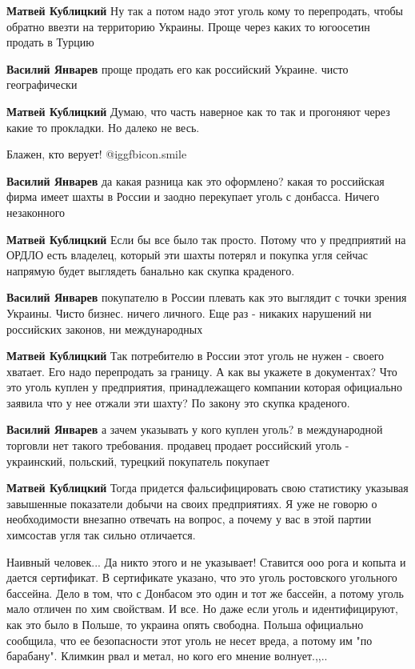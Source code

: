 \begin{itemize}
\begin{itemize}
\textbf{Матвей Кублицкий} Ну так а потом надо этот уголь кому то перепродать, чтобы обратно ввезти на территорию Украины. Проще через каких то югоосетин продать в Турцию

\textbf{Василий Январев} проще продать его как российский Украине. чисто географически

\textbf{Матвей Кублицкий} Думаю, что часть наверное как то так и прогоняют через какие то прокладки. Но далеко не весь.

Блажен, кто верует!
 @igg{fbicon.smile} 

\textbf{Василий Январев} да какая разница как это оформлено? какая то российская фирма имеет шахты в России и заодно перекупает уголь с донбасса. Ничего незаконного

\textbf{Матвей Кублицкий} Если бы все было так просто. Потому что у предприятий на ОРДЛО есть владелец, который эти шахты потерял и покупка угля сейчас напрямую будет выглядеть банально как скупка краденого.

\textbf{Василий Январев} покупателю в России плевать как это выглядит с точки зрения Украины. Чисто бизнес. ничего личного. Еще раз - никаких нарушений ни российских законов, ни международных

\textbf{Матвей Кублицкий} Так потребителю в России этот уголь не нужен - своего хватает. Его надо перепродать за границу. А как вы укажете в документах? Что это уголь куплен у предприятия, принадлежащего компании которая официально заявила что у нее отжали эти шахту? По закону это скупка краденого.

\textbf{Василий Январев} а зачем указывать у кого куплен уголь? в международной торговли нет такого требования. продавец продает российский уголь - украинский, польский, турецкий покупатель покупает

\textbf{Матвей Кублицкий} Тогда придется фальсифицировать свою статистику указывая завышенные показатели добычи на своих предприятиях. Я уже не говорю о необходимости внезапно отвечать на вопрос, а почему у вас в этой партии химсостав угля так сильно отличается.


\obeycr
Наивный человек...
Да никто этого и не указывает!
Ставится ооо рога и копыта и дается сертификат.
В сертификате указано, что это уголь ростовского угольного бассейна.
Дело в том, что с Донбасом это один и тот же бассейн, а потому уголь мало отличен по хим свойствам.
И все.
Но даже если уголь и идентифицируют, как это было в Польше, то украина опять свободна.
Польша официально сообщила, что ее безопасности этот уголь не несет вреда, а потому им "по барабану".
Климкин рвал и метал, но кого его мнение волнует.,,..
\restorecr


\end{itemize}
\end{itemize}
